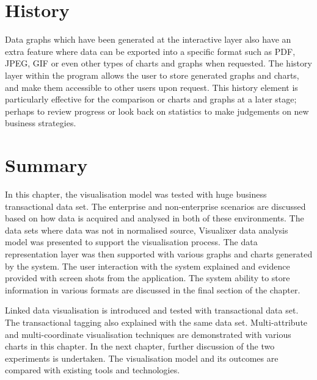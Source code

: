 \section{History}

Data graphs which have been generated at the interactive layer also have an extra feature where data can be exported into a specific format such as PDF, JPEG, GIF or even other types of charts and graphs when requested. The history layer within the program allows the user to store generated graphs and charts, and make them accessible to other users upon request. This history element is particularly effective for the comparison or charts and graphs at a later stage; perhaps to review progress or look back on statistics to make judgements on new business strategies.

\section{Summary}

In this chapter, the visualisation model was tested with huge business transactional data set. The enterprise and non-enterprise scenarios are discussed based on how data is acquired and analysed in both of these environments. The data sets where data was not in normalised source, Visualixer data analysis model was presented to support the visualisation process. The data representation layer was then supported with various graphs and charts generated by the system. The user interaction with the system explained and evidence provided with screen shots from the application. The system ability to store information in various formats are discussed in the final section of the chapter. 

Linked data visualisation is introduced and tested with transactional data set. The transactional tagging also explained with the same data set. Multi-attribute and multi-coordinate visualisation techniques are demonstrated with various charts in this chapter. In the next chapter, further discussion of the two experiments is undertaken. The visualisation model and its outcomes are compared with existing tools and technologies.